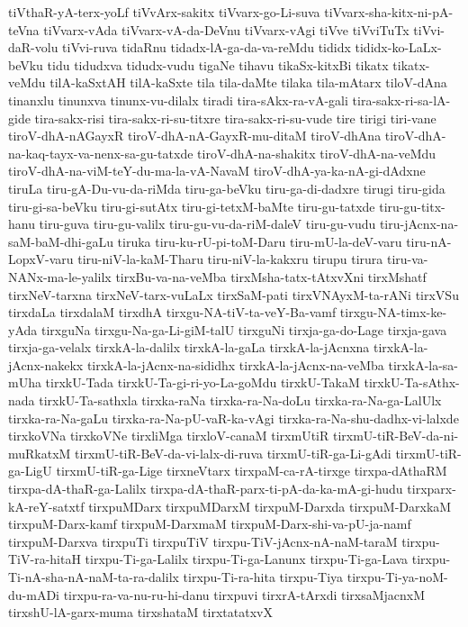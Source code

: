 {tiVthaR-yA-terx-yoLf
tiVvArx-sakitx
tiVvarx-go-Li-suva
tiVvarx-sha-kitx-ni-pA-teVna
tiVvarx-vAda
tiVvarx-vA-da-DeVnu
tiVvarx-vAgi
tiVve
tiVviTuTx
tiVvi-daR-volu
tiVvi-ruva
tidaRnu
tidadx-lA-ga-da-va-reMdu
tididx
tididx-ko-LaLx-beVku
tidu
tidudxva
tidudx-vudu
tigaNe
tihavu
tikaSx-kitxBi
tikatx
tikatx-veMdu
tilA-kaSxtAH
tilA-kaSxte
tila
tila-daMte
tilaka
tila-mAtarx
tiloV-dAna
tinanxlu
tinunxva
tinunx-vu-dilalx
tiradi
tira-sAkx-ra-vA-gali
tira-sakx-ri-sa-lA-gide
tira-sakx-risi
tira-sakx-ri-su-titxre
tira-sakx-ri-su-vude
tire
tirigi
tiri-vane
tiroV-dhA-nAGayxR
tiroV-dhA-nA-GayxR-mu-ditaM
tiroV-dhAna
tiroV-dhA-na-kaq-tayx-va-nenx-sa-gu-tatxde
tiroV-dhA-na-shakitx
tiroV-dhA-na-veMdu
tiroV-dhA-na-viM-teY-du-ma-la-vA-NavaM
tiroV-dhA-ya-ka-nA-gi-dAdxne
tiruLa
tiru-gA-Du-vu-da-riMda
tiru-ga-beVku
tiru-ga-di-dadxre
tirugi
tiru-gida
tiru-gi-sa-beVku
tiru-gi-sutAtx
tiru-gi-tetxM-baMte
tiru-gu-tatxde
tiru-gu-titx-hanu
tiru-guva
tiru-gu-valilx
tiru-gu-vu-da-riM-daleV
tiru-gu-vudu
tiru-jAcnx-na-saM-baM-dhi-gaLu
tiruka
tiru-ku-rU-pi-toM-Daru
tiru-mU-la-deV-varu
tiru-nA-LopxV-varu
tiru-niV-la-kaM-Tharu
tiru-niV-la-kakxru
tirupu
tirura
tiru-va-NANx-ma-le-yalilx
tirxBu-va-na-veMba
tirxMsha-tatx-tAtxvXni
tirxMshatf
tirxNeV-tarxna
tirxNeV-tarx-vuLaLx
tirxSaM-pati
tirxVNAyxM-ta-rANi
tirxVSu
tirxdaLa
tirxdalaM
tirxdhA
tirxgu-NA-tiV-ta-veY-Ba-vamf
tirxgu-NA-timx-ke-yAda
tirxguNa
tirxgu-Na-ga-Li-giM-talU
tirxguNi
tirxja-ga-do-Lage
tirxja-gava
tirxja-ga-velalx
tirxkA-la-dalilx
tirxkA-la-gaLa
tirxkA-la-jAcnxna
tirxkA-la-jAcnx-nakekx
tirxkA-la-jAcnx-na-sididhx
tirxkA-la-jAcnx-na-veMba
tirxkA-la-sa-mUha
tirxkU-Tada
tirxkU-Ta-gi-ri-yo-La-goMdu
tirxkU-TakaM
tirxkU-Ta-sAthx-nada
tirxkU-Ta-sathxla
tirxka-raNa
tirxka-ra-Na-doLu
tirxka-ra-Na-ga-LalUlx
tirxka-ra-Na-gaLu
tirxka-ra-Na-pU-vaR-ka-vAgi
tirxka-ra-Na-shu-dadhx-vi-lalxde
tirxkoVNa
tirxkoVNe
tirxliMga
tirxloV-canaM
tirxmUtiR
tirxmU-tiR-BeV-da-ni-muRkatxM
tirxmU-tiR-BeV-da-vi-lalx-di-ruva
tirxmU-tiR-ga-Li-gAdi
tirxmU-tiR-ga-LigU
tirxmU-tiR-ga-Lige
tirxneVtarx
tirxpaM-ca-rA-tirxge
tirxpa-dAthaRM
tirxpa-dA-thaR-ga-Lalilx
tirxpa-dA-thaR-parx-ti-pA-da-ka-mA-gi-hudu
tirxparx-kA-reY-satxtf
tirxpuMDarx
tirxpuMDarxM
tirxpuM-Darxda
tirxpuM-DarxkaM
tirxpuM-Darx-kamf
tirxpuM-DarxmaM
tirxpuM-Darx-shi-va-pU-ja-namf
tirxpuM-Darxva
tirxpuTi
tirxpuTiV
tirxpu-TiV-jAcnx-nA-naM-taraM
tirxpu-TiV-ra-hitaH
tirxpu-Ti-ga-Lalilx
tirxpu-Ti-ga-Lanunx
tirxpu-Ti-ga-Lava
tirxpu-Ti-nA-sha-nA-naM-ta-ra-dalilx
tirxpu-Ti-ra-hita
tirxpu-Tiya
tirxpu-Ti-ya-noM-du-mADi
tirxpu-ra-va-nu-ru-hi-danu
tirxpuvi
tirxrA-tArxdi
tirxsaMjacnxM
tirxshU-lA-garx-muma
tirxshataM
tirxtatatxvX
}
